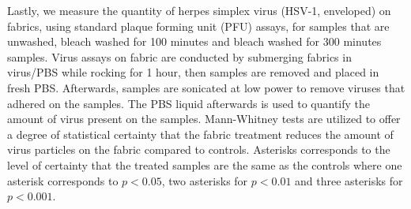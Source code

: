 \documentclass[10pt,letterpaper]{article}
\begin{document}
Lastly, we measure the quantity of herpes simplex virus (HSV-1, enveloped) on fabrics, using standard plaque forming unit (PFU) assays, for samples that are unwashed, bleach washed for 100 minutes and bleach washed for 300 minutes samples.
Virus assays on fabric are conducted by submerging fabrics in virus/PBS while rocking for 1 hour, then samples are removed and placed in fresh PBS. Afterwards, samples are sonicated at low power to remove viruses that adhered on the samples. The PBS liquid afterwards is used to quantify the amount of virus present on the samples. Mann-Whitney tests are utilized to offer a degree of statistical certainty that the fabric treatment reduces the amount of virus particles on the fabric compared to controls. Asterisks corresponds to the level of certainty that the treated samples are the same as the controls where one asterisk corresponds to $p < 0.05$, two asterisks for $p < 0.01$ and three asterisks for $p < 0.001$.



\end{document}
